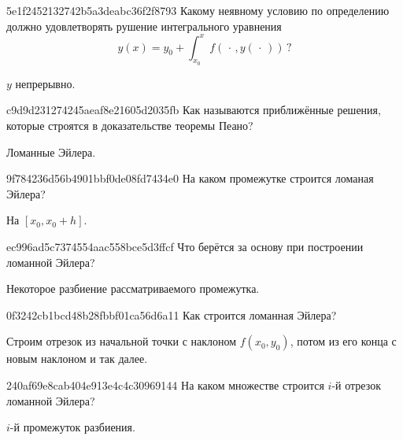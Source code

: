 \begin{note}{5e1f2452132742b5a3deabc36f2f8793}
    Какому неявному условию по определению должно удовлетворять рушение интегрального уравнения
    \[
        y(x) = y_0 + \int_{x_0}^{x} f(\,\cdot\,, y(\,\cdot\,))\,?
    \]

    \begin{cloze}{1}
        \({ y }\) непрерывно.
    \end{cloze}
\end{note}

\begin{note}{c9d9d231274245aeaf8e21605d2035fb}
    Как называются приближённые решения, которые строятся в доказательстве теоремы Пеано?

    \begin{cloze}{1}
        Ломанные Эйлера.
    \end{cloze}
\end{note}

\begin{note}{9f784236d56b4901bbf0de08fd7434e0}
    На каком промежутке строится ломаная Эйлера?

    \begin{cloze}{1}
        На \({ [x_0, x_0+h] }\).
    \end{cloze}
\end{note}

\begin{note}{ec996ad5c7374554aac558bce5d3ffcf}
    Что берётся за основу при построении ломанной Эйлера?

    \begin{cloze}{1}
        Некоторое разбиение рассматриваемого промежутка.
    \end{cloze}
\end{note}

\begin{note}{0f3242cb1bcd48b28fbbf01ca56d6a11}
    Как строится ломанная Эйлера?

    \begin{cloze}{1}
        Строим отрезок из начальной точки с наклоном \({ f(x_0, y_0) }\), потом из его конца с новым наклоном и так далее.
    \end{cloze}
\end{note}

\begin{note}{240af69e8cab404e913e4c4c30969144}
    На каком множестве строится \({ i }\)-й отрезок ломанной Эйлера?

    \begin{cloze}{1}
        \({ i }\)-й промежуток разбиения.
    \end{cloze}
\end{note}

